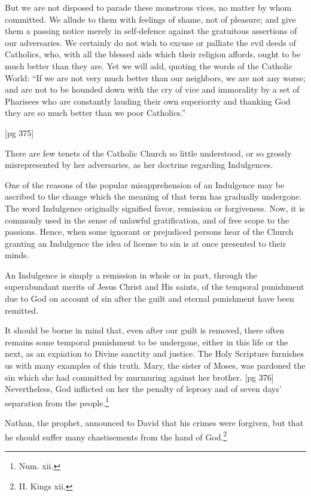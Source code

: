 But we are not disposed to parade these monstrous
vices, no matter by whom committed. We
allude to them with feelings of shame, not of pleasure;
and give them a passing notice merely in
self-defence against the gratuitous assertions of
our adversaries. We certainly do not wish to excuse
or palliate the evil deeds of Catholics, who,
with all the blessed aids which their religion affords,
ought to be much better than they are. Yet
we will add, quoting the words of the Catholic
World: “If we are not very much better than our
neighbors, we are not any worse; and are not to be
hounded down with the cry of vice and immorality
by a set of Pharisees who are constantly lauding
their own superiority and thanking God they are
so much better than we poor Catholics.”

[pg 375]


There are few tenets of the Catholic Church
so little understood, or so grossly misrepresented
by her adversaries, as her doctrine
regarding Indulgences.

One of the reasons of the popular misapprehension
of an Indulgence may be ascribed to the
change which the meaning of that term has gradually
undergone. The word Indulgence originally
signified favor, remission or forgiveness. Now,
it is commonly used in the sense of unlawful gratification,
and of free scope to the passions. Hence,
when some ignorant or prejudiced persons hear of
the Church granting an Indulgence the idea of
license to sin is at once presented to their minds.

An Indulgence is simply a remission in whole or
in part, through the superabundant merits of
Jesus Christ and His saints, of the temporal
punishment due to God on account of sin after the
guilt and eternal punishment have been remitted.

It should be borne in mind that, even after our
guilt is removed, there often remains some temporal
punishment to be undergone, either in this
life or the next, as an expiation to Divine sanctity
and justice. The Holy Scripture furnishes us
with many examples of this truth. Mary, the sister
of Moses, was pardoned the sin which she had
committed by murmuring against her brother.
[pg 376]
Nevertheless, God inflicted on her the penalty of
leprosy and of seven days' separation from the
people.\footnote{Num. xii.}

Nathan, the prophet, announced to David that
his crimes were forgiven, but that he should suffer
many chastisements from the hand of God.\footnote{II. Kings xii.}

